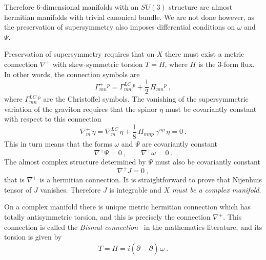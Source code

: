 \documentclass[12pt,a4paper]{article}
\def\bar#1{\overline{#1}}
\theoremstyle{definition}
\begin{document}
Therefore 6-dimensional manifolds with an $SU(3)$ structure are almost hermitian manifolds with trivial canonical bundle. We are not done however, as the preservation of  supersymmetry  also imposes differential conditions on $\omega$ and $\Psi$. 

Preservation of supersymmetry requires that on $X$ there must exist a metric connection $\nabla^+$ with skew-symmetric torsion $T=H$, where $H$ is the 3-form flux.  In other words, the connection symbols are
\begin{equation}
 \Gamma^+_{mn}{}^p = \Gamma^{LC}_{mn}{}^{\, p} + \frac{1}{2}\, H_{mn}{}^p~,\label{eq:BismutGamma}
 \end{equation}
where $\Gamma^{LC}_{mn}{}^{\, p}$ are the Christoffel symbols.
The vanishing of the supersymmetric variation of the graviton requires that the spinor $\eta$ must be covariantly constant with respect to this connection
\[ \nabla^+_m\,\eta = \nabla^{LC}_m\, \eta + \frac{1}{8}\, H_{mnp}\, \gamma^{np}\, \eta = 0~.\]
This in turn means that the forms $\omega$ and $\Psi$ are covariantly constant
\[ \nabla^+\Psi = 0~,\qquad \nabla^+\omega= 0~.\]
The almost complex structure determined by $\Psi$ must also be covariantly constant
\[ \nabla^+ J = 0~,\]
that is $\nabla^+$ is a hermitian connection. It is straightforward to prove that Nijenhuis tensor of $J$ vanishes. Therefore $J$ is integrable and $X$ {\it must be a complex manifold}.

On a complex manifold there is unique metric hermitian connection which has  totally antisymmetric torsion, and this is precisely the connection $\nabla^+$.  This connection is called the {\it Bismut connection}~\citep{0666.58042} in the mathematics literature, and its torsion is given by
\begin{equation}
T= H = i(\partial - \bar\partial)\,\omega~.\label{eq:Bismut}
\end{equation}
\end{document}
